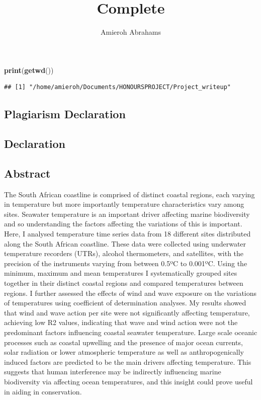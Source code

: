 \documentclass[12pt,A4paper,]{article}
\title{Complete}
\author{Amieroh Abrahams}
\date{}
\newenvironment{Shaded}{\begin{snugshade}}{\end{snugshade}}
\newcommand{\KeywordTok}[1]{\textcolor[rgb]{0.13,0.29,0.53}{\textbf{#1}}}
\newcommand{\NormalTok}[1]{#1}
\begin{document}
\maketitle

{
\setcounter{tocdepth}{4}
\tableofcontents
}
\begin{Shaded}
\begin{Highlighting}[]
\KeywordTok{print}\NormalTok{(}\KeywordTok{getwd}\NormalTok{())}
\end{Highlighting}
\end{Shaded}

\begin{verbatim}
## [1] "/home/amieroh/Documents/HONOURSPROJECT/Project_writeup"
\end{verbatim}

\newpage

\subsection{Plagiarism Declaration}\label{plagiarism-declaration}

\newpage

\subsection{Declaration}\label{declaration}

\newpage

\subsection{Abstract}\label{abstract}

The South African coastline is comprised of distinct coastal regions,
each varying in temperature but more importantly temperature
characteristics vary among sites. Seawater temperature is an important
driver affecting marine biodiversity and so understanding the factors
affecting the variations of this is important. Here, I analysed
temperature time series data from 18 different sites distributed along
the South African coastline. These data were collected using underwater
temperature recorders (UTRs), alcohol thermometers, and satellites, with
the precision of the instruments varying from between 0.5ºC to 0.001ºC.
Using the minimum, maximum and mean temperatures I systematically
grouped sites together in their distinct coastal regions and compared
temperatures between regions. I further assessed the effects of wind and
wave exposure on the variations of temperatures using coefficient of
determination analyses. My results showed that wind and wave action per
site were not significantly affecting temperature, achieving low R2
values, indicating that wave and wind action were not the predominant
factors influencing coastal seawater temperature. Large scale oceanic
processes such as coastal upwelling and the presence of major ocean
currents, solar radiation or lower atmospheric temperature as well as
anthropogenically induced factors are predicted to be the main drivers
affecting temperature. This suggests that human interference may be
indirectly influencing marine biodiversity via affecting ocean
temperatures, and this insight could prove useful in aiding in
conservation.
\end{document}

